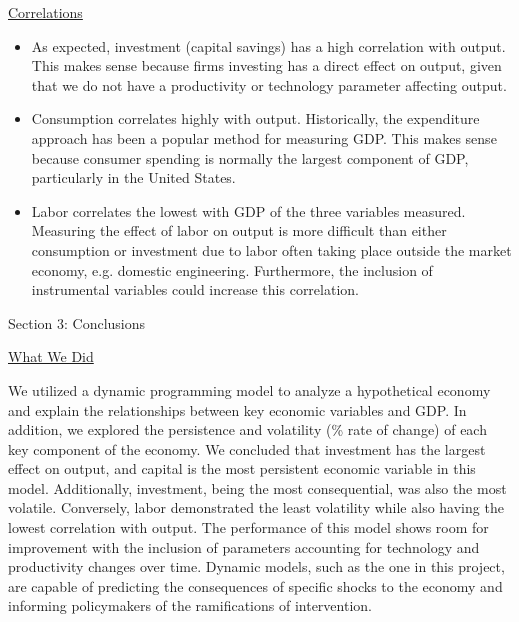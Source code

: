 \documentclass[12pt]{article}
\begin{document}
\begin{doublespace}
\begin{center}
\normalsize\underline{Correlations}
\end{center}

\begin{itemize}
\item As expected, investment (capital savings) has a high correlation with output. This makes sense because firms investing has a direct effect on output, given that we do not have a productivity or technology parameter affecting output.
\item Consumption correlates highly with output. Historically, the expenditure approach has been a popular method for measuring GDP. This makes sense because consumer spending is normally the largest component of GDP, particularly in the United States. 
\item Labor correlates the lowest with GDP of the three variables measured. Measuring the effect of labor on output is more difficult than either consumption or investment due to labor often taking place outside the market economy, e.g. domestic engineering. Furthermore, the inclusion of instrumental variables could increase this correlation.
\end{itemize}

\newpage
\begin{center}
\LARGE{Section 3: Conclusions}
\end{center}

\begin{center}
\normalsize\underline{What We Did}
\end{center}

We utilized a dynamic programming model to analyze a hypothetical economy and explain the relationships between key economic variables and GDP. In addition, we explored the persistence and volatility (\% rate of change) of each key component of the economy. We concluded that investment has the largest effect on output, and capital is the most persistent economic variable in this model. Additionally, investment, being the most consequential, was also the most volatile. Conversely, labor demonstrated the least volatility while also having the lowest correlation with output. The performance of this model shows room for improvement with the inclusion of parameters accounting for technology and productivity changes over time. Dynamic models, such as the one in this project, are capable of predicting the consequences of specific shocks to the economy and informing policymakers of the ramifications of intervention.


\end{doublespace}
\end{document}
